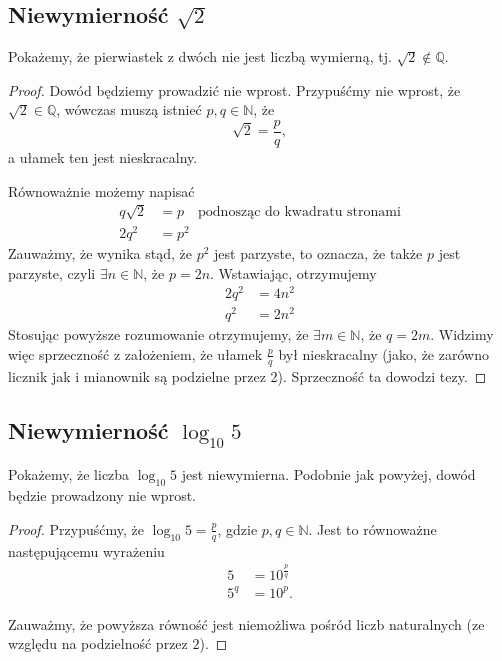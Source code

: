 \subsection{Niewymierność $\sqrt{2}$}

Pokażemy, że pierwiastek z dwóch nie jest liczbą wymierną, tj. $\sqrt{2} \notin \mathbb{Q}$.
\begin{proof}
Dowód będziemy prowadzić nie wprost. 
Przypuśćmy nie wprost, że $\sqrt{2} \in \mathbb{Q}$, wówczas muszą istnieć $p,q\in\mathbb{N}$, że
$$ \sqrt{2} = \frac{p}{q},$$
a ułamek ten jest nieskracalny.

Równoważnie możemy napisać
\begin{align*}
q\sqrt{2} &= p \quad \mbox{podnosząc do kwadratu stronami}\\
2 q^2 &= p^2
\end{align*}
Zauważmy, że wynika stąd, że $p^2$ jest parzyste, to oznacza, że także $p$ jest parzyste, czyli $\exists n\in\mathbb{N}$, że $p = 2n$. Wstawiając, otrzymujemy
\begin{align*}
2q^2 &= 4 n^2 \\
q^2 & = 2 n^2
\end{align*}
Stosując powyższe rozumowanie otrzymujemy, że $\exists m \in \mathbb{N}$, że $q = 2m$. Widzimy więc sprzeczność z założeniem, że ułamek $\frac{p}{q}$ był nieskracalny (jako, że zarówno licznik jak i mianownik są podzielne przez 2). Sprzeczność ta dowodzi tezy.
\end{proof}
 
\subsection{Niewymierność $\log_{10} 5$}
Pokażemy, że liczba $\log_{10} 5$ jest niewymierna.
Podobnie jak powyżej, dowód będzie prowadzony nie wprost.

\begin{proof}
Przypuśćmy, że $\log_{10}5 = \frac{p}{q}$, gdzie $p,q\in\mathbb{N}$. Jest to równoważne następującemu wyrażeniu
\begin{align*}
 5 &= 10^{\frac{p}{q}} \\
 5^q & = 10^p.
\end{align*}

Zauważmy, że powyższa równość jest niemożliwa pośród liczb naturalnych (ze względu na podzielność przez $2$). 

\end{proof}


